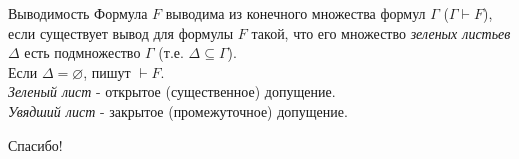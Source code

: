 \documentclass{beamer}
\begin{document}
\begin{frame}{Выводимость}
Формула $F$ выводима из конечного множества формул $\Gamma$ ($\Gamma \vdash F$), если существует вывод для формулы $F$ такой, что его множество \textit{зеленых листьев} $\Delta$ есть подмножество $\Gamma$ (т.е. $\Delta \subseteq \Gamma$).\\
\bigskip
Если $\Delta = \varnothing$, пишут $\vdash F$.\\
\bigskip
\textit{Зеленый лист} - открытое (существенное) допущение.\\
\bigskip
\textit{Увядший лист} - закрытое (промежуточное) допущение.\\

\end{frame}


\begin{frame}{}
    \thispagestyle{empty}
    \begin{center}
        {\large Спасибо!}
    \end{center}
\end{frame}


\end{document}
